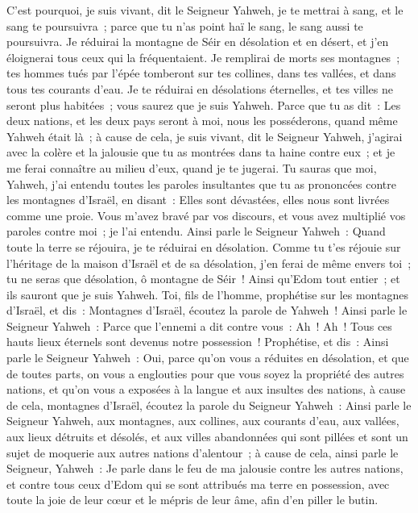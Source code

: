 \begin{multicols}{2}
C'est pourquoi, je suis vivant, dit le Seigneur Yahweh, je te mettrai à sang, et le sang te poursuivra~; parce que tu n'as point haï le sang, le sang aussi te poursuivra.
Je réduirai la montagne de Séir en désolation et en désert, et j'en éloignerai tous ceux qui la fréquentaient.
Je remplirai de morts ses montagnes~; tes hommes tués par l'épée tomberont sur tes collines, dans tes vallées, et dans tous tes courants d'eau.
Je te réduirai en désolations éternelles, et tes villes ne seront plus habitées~; vous saurez que je suis Yahweh.
Parce que tu as dit~: Les deux nations, et les deux pays seront à moi, nous les posséderons, quand même Yahweh était là~;
à cause de cela, je suis vivant, dit le Seigneur Yahweh, j'agirai avec la colère et la jalousie que tu as montrées dans ta haine contre eux~; et je me ferai connaître au milieu d'eux, quand je te jugerai.
Tu sauras que moi, Yahweh, j'ai entendu toutes les paroles insultantes que tu as prononcées contre les montagnes d'Israël, en disant~: Elles sont dévastées, elles nous sont livrées comme une proie.
Vous m'avez bravé par vos discours, et vous avez multiplié vos paroles contre moi~; je l'ai entendu.
Ainsi parle le Seigneur Yahweh~: Quand toute la terre se réjouira, je te réduirai en désolation.
Comme tu t'es réjouie sur l'héritage de la maison d'Israël et de sa désolation, j'en ferai de même envers toi~; tu ne seras que désolation, ô montagne de Séir~! Ainsi qu'Edom tout entier~; et ils sauront que je suis Yahweh.
\VerseOne{}Toi, fils de l'homme, prophétise sur les montagnes d'Israël, et dis~: Montagnes d'Israël, écoutez la parole de Yahweh~!
Ainsi parle le Seigneur Yahweh~: Parce que l'ennemi a dit contre vous~: Ah~! Ah~! Tous ces hauts lieux éternels sont devenus notre possession~!
Prophétise, et dis~: Ainsi parle le Seigneur Yahweh~: Oui, parce qu'on vous a réduites en désolation, et que de toutes parts, on vous a englouties pour que vous soyez la propriété des autres nations, et qu'on vous a exposées à la langue et aux insultes des nations,
à cause de cela, montagnes d'Israël, écoutez la parole du Seigneur Yahweh~: Ainsi parle le Seigneur Yahweh, aux montagnes, aux collines, aux courants d'eau, aux vallées, aux lieux détruits et désolés, et aux villes abandonnées qui sont pillées et sont un sujet de moquerie aux autres nations d'alentour~;
à cause de cela, ainsi parle le Seigneur, Yahweh~: Je parle dans le feu de ma jalousie contre les autres nations, et contre tous ceux d'Edom qui se sont attribués ma terre en possession, avec toute la joie de leur cœur et le mépris de leur âme, afin d'en piller le butin.

\end{multicols}
